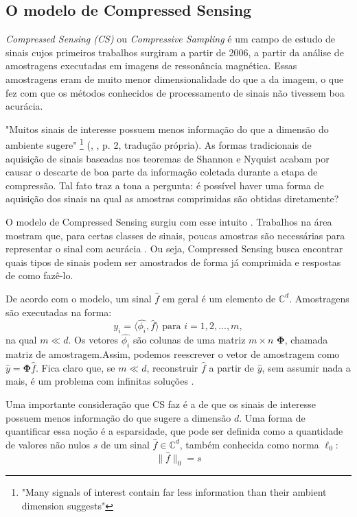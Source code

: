 \documentclass[cic,tc]{iiufrgs}
\begin{document}
\subsection{O modelo de Compressed Sensing}
\textit{Compressed Sensing (CS)} ou \textit{Compressive Sampling} é um campo de estudo de sinais cujos
primeiros trabalhos surgiram a partir de 2006, a partir da análise de amostragens executadas em imagens de 
ressonância magnética. Essas amostragens eram de muito menor dimensionalidade do que a da imagem, o que 
fez com que os métodos conhecidos de processamento de sinais não tivessem boa acurácia.

"Muitos sinais de interesse possuem menos informação do que a dimensão do ambiente sugere"
\footnote{"Many signals of interest contain far less information than their ambient dimension suggests"}
(\citeauthor{chen2015compressed}, \citeyear{chen2015compressed}, p. 2, tradução própria).
As formas tradicionais de aquisição de sinais baseadas nos teoremas de Shannon e Nyquist acabam por causar o descarte
de boa parte da informação coletada durante a etapa de compressão. Tal fato traz a tona a pergunta: é possível haver 
uma forma de aquisição dos sinais na qual as amostras comprimidas são obtidas diretamente? 

O modelo de Compressed Sensing surgiu com esse intuito \cite{DonohoCS}. Trabalhos na área mostram que, para certas classes
de sinais, poucas amostras são necessárias para representar o sinal com acurácia \cite{chen2015compressed}.
Ou seja, Compressed Sensing busca encontrar quais tipos
de sinais podem ser amostrados de forma já comprimida e respostas de como fazê-lo.

De acordo com o modelo, um sinal $ \hat{f} $ em geral é um elemento de $ \mathbb{C}^d $. Amostragens são executadas na forma:
\begin{equation}
    y_i = \langle \hat{\phi_i}, \hat{f} \rangle \text{ para } i=1,2,...,m, 
\end{equation}
na qual $m \ll d$. Os vetores $\hat{\phi_i}$ são colunas de uma matriz $m \times n$ $\mathbf{\Phi}$, chamada matriz 
de amostragem.Assim, podemos reescrever o vetor de amostragem como $\hat{y} = \mathbf{\Phi} \hat{f}$. Fica claro que, 
se $ m \ll d$, reconstruir $\hat{f}$ a partir de $\hat{y}$, sem assumir nada a mais, é um problema 
com infinitas soluções \cite{chen2015compressed}.

Uma importante consideração que CS faz é a de que os sinais de interesse possuem menos informação do que sugere a 
dimensão $d$. Uma forma de quantificar essa noção é a esparsidade, que pode ser definida como a quantidade de valores não
nulos $s$ de um sinal $\hat{f} \in \mathbb{C}^d$, também conhecida como norma $\ell_0$:
\begin{equation}
    \lVert \hat{f} \rVert_0 = s
\end{equation}
\end{document}
